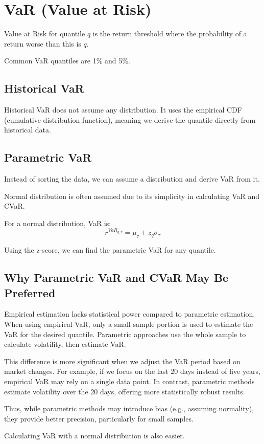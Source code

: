 \documentclass{article}
\begin{document}
\section{VaR (Value at Risk)}
Value at Risk for quantile $q$ is the return threshold where the probability of a return worse than this is $q$.

Common VaR quantiles are 1\% and 5\%.

\subsection{Historical VaR}
Historical VaR does not assume any distribution. It uses the empirical CDF (cumulative distribution function), meaning we derive the quantile directly from historical data.

\subsection{Parametric VaR}
Instead of sorting the data, we can assume a distribution and derive VaR from it.

Normal distribution is often assumed due to its simplicity in calculating VaR and CVaR.

For a normal distribution, VaR is:
$$ r^{VaR_{q,\tau}} = \mu_\tau + z_q \sigma_\tau $$

Using the z-score, we can find the parametric VaR for any quantile.

\subsection{Why Parametric VaR and CVaR May Be Preferred}
Empirical estimation lacks statistical power compared to parametric estimation. When using empirical VaR, only a small sample portion is used to estimate the VaR for the desired quantile. Parametric approaches use the whole sample to calculate volatility, then estimate VaR.

This difference is more significant when we adjust the VaR period based on market changes. For example, if we focus on the last 20 days instead of five years, empirical VaR may rely on a single data point. In contrast, parametric methods estimate volatility over the 20 days, offering more statistically robust results.

Thus, while parametric methods may introduce bias (e.g., assuming normality), they provide better precision, particularly for small samples.

Calculating VaR with a normal distribution is also easier.
\end{document}
